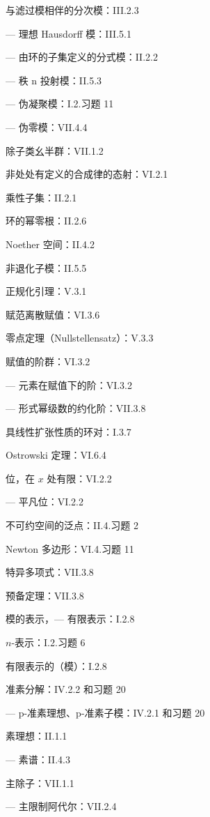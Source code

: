 \begin{Shaded}
\begin{Highlighting}[]
\end{Highlighting}
\end{Shaded}

与滤过模相伴的分次模：III.2.3

--- 理想 Hausdorff 模：III.5.1

--- 由环的子集定义的分式模：II.2.2

--- 秩 n 投射模：II.5.3

--- 伪凝聚模：I.2.习题 11

--- 伪零模：VII.4.4

除子类幺半群：VII.1.2

非处处有定义的合成律的态射：VI.2.1

乘性子集：II.2.1

环的幂零根：II.2.6

Noether 空间：II.4.2

非退化子模：II.5.5

正规化引理：V.3.1

赋范离散赋值：VI.3.6

零点定理（Nullstellensatz）：V.3.3

赋值的阶群：VI.3.2

--- 元素在赋值下的阶：VI.3.2

--- 形式幂级数的约化阶：VII.3.8

具线性扩张性质的环对：I.3.7

Ostrowski 定理：VI.6.4

位，在 \(x\) 处有限：VI.2.2

--- 平凡位：VI.2.2

不可约空间的泛点：II.4.习题 2

Newton 多边形：VI.4.习题 11

特异多项式：VII.3.8

预备定理：VII.3.8

模的表示，--- 有限表示：I.2.8

\(n\)-表示：I.2.习题 6

有限表示的（模）：I.2.8

准素分解：IV.2.2 和习题 20

--- p-准素理想、p-准素子模：IV.2.1 和习题 20

素理想：II.1.1

--- 素谱：II.4.3

主除子：VII.1.1

--- 主限制阿代尔：VII.2.4

